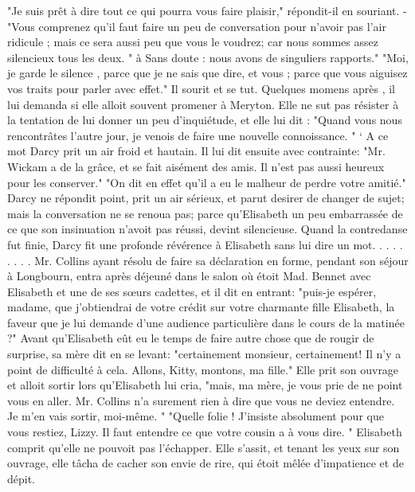 "Je suis prêt à dire tout ce qui pourra vous faire plaisir," répondit-il en souriant. - "Vous comprenez qu'il faut faire un peu de conversation pour n'avoir pas l'air ridicule ; mais ce sera aussi peu que vous le voudrez; car nous sommes assez silencieux tous les deux. " à Sans doute : nous avons de singuliers rapports."
"Moi, je garde le silence , parce que je ne sais que dire, et vous ; parce que vous aiguisez vos traits pour parler avec effet."
Il sourit et se tut. Quelques momens après , il lui demanda si elle alloit souvent promener à Meryton.
Elle ne sut pas résister à la tentation de lui donner un peu d'inquiétude, et elle lui dit : "Quand vous nous rencontrâtes l'autre jour, je venois de faire une nouvelle connoissance. "
` A ce mot Darcy prit un air froid et hautain. Il lui dit ensuite avec contrainte: "Mr.\setcounter{page}{405} Wickam a de la grâce, et se fait aisément des amis. Il n’est pas aussi heureux pour les conserver."
"On dit en effet qu’il a eu le malheur de perdre votre amitié."
Darcy ne répondit point, prit un air sérieux, et parut desirer de changer de sujet; mais la conversation ne se renoua pas; parce qu’Elisabeth un peu embarrassée de ce que son insinuation n’avoit pas réussi, devint silencieuse. Quand la contredanse fut finie, Darcy fit une profonde révérence à Elisabeth sans lui dire un mot. . . . . . . . .
Mr. Collins ayant résolu de faire sa déclaration en forme, pendant son séjour à Longbourn, entra après déjeuné dans le salon où étoit Mad. Bennet avec Elisabeth et une de ses sœurs cadettes, et il dit en entrant: "puis-je espérer, madame, que j’obtiendrai de votre crédit sur votre charmante fille Elisabeth, la faveur que je lui demande d’une audience particulière dans le cours de la matinée ?"
Avant qu’Elisabeth eût eu le temps de faire autre chose que de rougir de surprise, sa mère dit en se levant: "certainement monsieur, certainement! Il n’y a point de difficulté à cela. Allons, Kitty, montons, ma\setcounter{page}{406} fille." Elle prit son ouvrage et alloit sortir lors qu'Elisabeth lui cria, "mais, ma mère, je vous prie de ne point vous en aller. Mr. Collins n'a surement rien à dire que vous ne deviez entendre. Je m'en vais sortir, moi-même. "
"Quelle folie ! J'insiste absolument pour que vous restiez, Lizzy. Il faut entendre ce que votre cousin a à vous dire. "
Elisabeth comprit qu'elle ne pouvoit pas l'échapper. Elle s'assit, et tenant les yeux sur son ouvrage, elle tâcha de cacher son envie de rire, qui étoit mêlée d'impatience et de dépit.
